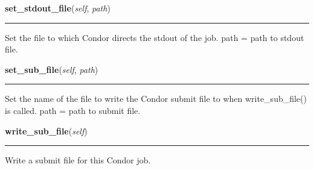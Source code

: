     \label{pipeline:CondorJob:set_stdout_file}
    \vspace{0.5ex}

    \noindent\begin{boxedminipage}{\textwidth}

    \raggedright \textbf{set\_stdout\_file}(\textit{self}, \textit{path})

    \vspace{-1.5ex}

    \rule{\textwidth}{0.5\fboxrule}
    Set the file to which Condor directs the stdout of the job. path = 
    path to stdout file.

    \vspace{1ex}

    \end{boxedminipage}

    \label{pipeline:CondorJob:set_sub_file}
    \vspace{0.5ex}

    \noindent\begin{boxedminipage}{\textwidth}

    \raggedright \textbf{set\_sub\_file}(\textit{self}, \textit{path})

    \vspace{-1.5ex}

    \rule{\textwidth}{0.5\fboxrule}
    Set the name of the file to write the Condor submit file to when 
    write\_sub\_file() is called. path = path to submit file.

    \vspace{1ex}

    \end{boxedminipage}

    \label{pipeline:CondorJob:write_sub_file}
    \vspace{0.5ex}

    \noindent\begin{boxedminipage}{\textwidth}

    \raggedright \textbf{write\_sub\_file}(\textit{self})

    \vspace{-1.5ex}

    \rule{\textwidth}{0.5\fboxrule}
    Write a submit file for this Condor job.

    \vspace{1ex}

    \end{boxedminipage}

